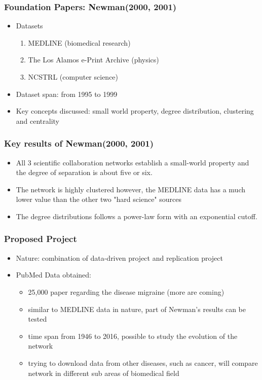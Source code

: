 \documentclass{beamer}
\begin{document}
\begin{frame}\frametitle{Foundation Papers: Newman(2000, 2001)}
\begin{itemize}
\item Datasets
\begin{enumerate}
	\item MEDLINE (biomedical research)
	\item The Los Alamos e-Print Archive (physics)
	\item NCSTRL (computer science)
\end{enumerate}
\item Dataset span: from 1995 to 1999
\item Key concepts discussed: small world property, degree distribution, clustering and centrality
\end{itemize}
\end{frame}



\begin{frame}\frametitle{Key results of  Newman(2000, 2001) }
\begin{itemize}
\item All 3 scientific collaboration networks establish a small-world property and the degree of separation is about five or six.
\item The network is highly clustered however, the MEDLINE data has a much lower value than the other two "hard science" sources
\item The degree distributions follows a power-law form with an exponential cutoff.
\end{itemize}
\end{frame}

\begin{frame}\frametitle{Proposed Project}
\begin{itemize}
\item Nature: combination of data-driven project and replication project
\item PubMed Data obtained:
	\begin{itemize}
		\item 25,000 paper regarding the disease migraine (more are coming)
		\item similar to MEDLINE data in nature, part of Newman's results can be tested
		\item time span from 1946 to 2016, possible to study the evolution of the network
		\item trying to download data from other diseases, such as cancer, will compare network in different sub areas of biomedical field
	\end{itemize}
\end{itemize}

\end{frame}
\end{document}
